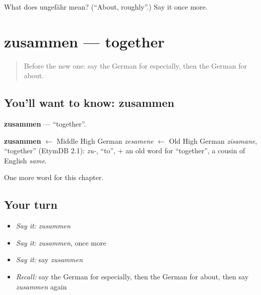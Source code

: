 \begin{tcolorbox}[breakable,colback=teal!4,colframe=teal!35!black,title={Before you move on}]
What does ungefähr mean? (\textquotedblleft{}About, roughly\textquotedblright{}.) Say it once more.
\end{tcolorbox}
\section[zusammen]{zusammen — together}

\label{lesson:GE-C173-zusammen}



\begin{quote}
Before the new one: say the German for especially, then the German for about.
\end{quote}

\subsection*{You'll want to know: zusammen}
\textbf{zusammen} — \textquotedblleft{}together\textquotedblright{}.

\begin{cousinweb}
\textbf{zusammen} $\leftarrow$ Middle High German \emph{zesamene} $\leftarrow$ Old High German \emph{zisamane}, \textquotedblleft{}together\textquotedblright{} (EtymDB 2.1): \emph{zu-}, \textquotedblleft{}to\textquotedblright{}, + an old word for \textquotedblleft{}together\textquotedblright{}, a cousin of English \emph{same}.
\end{cousinweb}

\begin{grammarlens}[title={What you've built}]
One more word for this chapter.
\end{grammarlens}

\subsection*{Your turn}
\begin{itemize}
\raggedright
  \item \emph{Say it:} \emph{zusammen}
  \item \emph{Say it:} \emph{zusammen}, once more
  \item \emph{Say it:} say \emph{zusammen}
  \item \emph{Recall:} say the German for especially, then the German for about, then say \emph{zusammen} again
\end{itemize}

